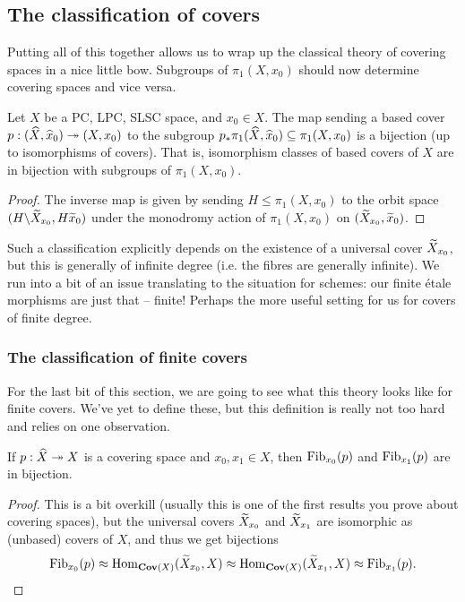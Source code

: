 \subsection{The classification of covers}
\label{subsec:3_4_classification_of_covers}
Putting all of this together allows us to wrap up the classical theory of covering spaces in a nice little bow. Subgroups of $\pi_1(X, x_0)$ should now determine covering spaces and vice versa.

\begin{thm}
	\label{thm:galois_theory_for_covering_spaces}
	Let $X$ be a PC, LPC, SLSC space, and $x_0 \in X$. The map sending a based cover $p: (\widehat{X}, \widehat{x}_0) \twoheadrightarrow (X, x_0)$ to the subgroup $p_*\pi_1(\widehat{X}, \widehat{x}_0) \subseteq \pi_1(X, x_0)$ is a bijection (up to isomorphisms of covers). That is, isomorphism classes of based covers of $X$ are in bijection with subgroups of $\pi_1(X, x_0)$.
\end{thm}
\begin{proof}
	The inverse map is given by sending $H \leq \pi_1(X, x_0)$ to the orbit space $(H \backslash \widetilde{X}_{x_0}, H\widetilde{x}_0)$ under the monodromy action of $\pi_1(X, x_0)$ on $(\widetilde{X}_{x_0}, \widetilde{x}_0)$.
\end{proof}

Such a classification explicitly depends on the existence of a universal cover $\widetilde{X}_{x_0}$, but this is generally of infinite degree (i.e. the fibres are generally infinite). We run into a bit of an issue translating to the situation for schemes: our finite \'etale morphisms are just that -- finite! Perhaps the more useful setting for us for covers of finite degree.

\subsubsection{The classification of finite covers}
\label{subsubsec:3_4_1_finite_covers}
For the last bit of this section, we are going to see what this theory looks like for finite covers. We've yet to define these, but this definition is really not too hard and relies on one observation.

\begin{lemma}
	If $p:\widehat{X} \twoheadrightarrow X$ is a covering space and $x_0, x_1 \in X$, then $\mathrm{Fib}_{x_0}(p)$ and $\mathrm{Fib}_{x_1}(p)$ are in bijection.
\end{lemma}
\begin{proof}
	This is a bit overkill (usually this is one of the first results you prove about covering spaces), but the universal covers $\widetilde{X}_{x_0}$ and $\widetilde{X}_{x_1}$ are isomorphic as (unbased) covers of $X$, and thus we get bijections
	\[
		\mathrm{Fib}_{x_0}(p) \approx \mathrm{Hom}_{\mathbf{Cov}(X)}(\widetilde{X}_{x_0}, X) \approx \mathrm{Hom}_{\mathbf{Cov}(X)}(\widetilde{X}_{x_1}, X) \approx \mathrm{Fib}_{x_1}(p). \qedhere
	\]
\end{proof}

